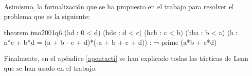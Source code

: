 Asimismo, la formalización que se ha propuesto en el trabajo para resolver el
problema que es la siguiente:

\begin{leancode}
theorem imo2001q6
  (hd  : 0 < d)
  (hdc : d < c)
  (hcb : c < b)
  (hba : b < a)
  (h : a*c + b*d = (a + b - c + d)*(-a + b + c + d))
  : ¬ prime (a*b + c*d)
\end{leancode}



Finalmente, en el apéndice \ref{apentacti} se han explicado todas
las tácticas de Lean que se han usado en el trabajo.



%
%

